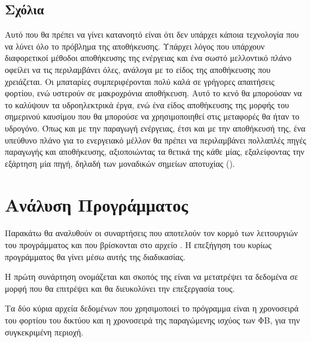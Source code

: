 \documentclass[12pt]{report}
\begin{document}
\section{Σχόλια}
Αυτό που θα πρέπει να γίνει κατανοητό είναι ότι δεν υπάρχει κάποια τεχνολογία που να λύνει όλο το πρόβλημα της αποθήκευσης. Υπάρχει λόγος που υπάρχουν διαφορετικοί μέθοδοι αποθήκευσης της ενέργειας και ένα σωστό μελλοντικό
πλάνο οφείλει να τις περιλαμβάνει όλες, ανάλογα με το είδος της αποθήκευσης που χρειάζεται. Οι μπαταρίες συμπεριφέρονται πολύ καλά σε γρήγορες απαιτήσεις φορτίου, ενώ υστερούν σε μακροχρόνια αποθήκευση. Αυτό το κενό θα
μπορούσαν να το καλύψουν τα υδροηλεκτρικά έργα, ενώ ένα είδος αποθήκευσης της μορφής του σημερινού καυσίμου που θα μπορούσε να χρησιμοποιηθεί στις μεταφορές θα ήταν το υδρογόνο. Όπως και με την παραγωγή ενέργειας, έτσι και
με την αποθήκευσή της, ένα υπεύθυνο πλάνο για το ενεργειακό μέλλον θα πρέπει να περιλαμβάνει πολλαπλές πηγές παραγωγής και αποθήκευσης, αξιοποιώντας τα θετικά της κάθε μίας, εξαλείφοντας την εξάρτηση μία πηγή, 
δηλαδή των μοναδικών σημείων αποτυχίας ({}).  
\chapter{Ανάλυση Προγράμματος}
Παρακάτω θα αναλυθούν οι συναρτήσεις που αποτελούν τον κορμό των λειτουργιών του προγράμματος και που βρίσκονται
στο αρχείο {}. Η επεξήγηση του κυρίως προγράμματος {} θα γίνει μέσω αυτής της διαδικασίας.

Η πρώτη συνάρτηση ονομάζεται {} και σκοπός της είναι να μετατρέψει τα δεδομένα
σε μορφή που θα επιτρέψει και θα διευκολύνει την επεξεργασία τους.

Τα δύο κύρια αρχεία δεδομένων που χρησιμοποιεί το πρόγραμμα είναι η χρονοσειρά του φορτίου του δικτύου και η 
χρονοσειρά της παραγώμενης ισχύος των ΦΒ, για την συγκεκριμένη περιοχή. 
\end{document}
